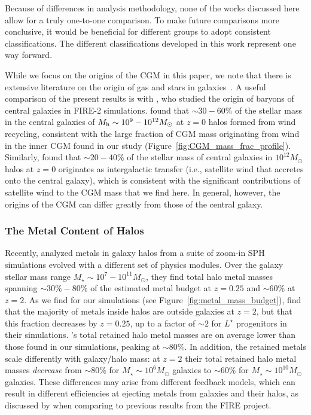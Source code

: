 \documentclass[fleqn,usenatbib]{mnras}
\begin{document}
Because of differences in analysis methodology, none of the works discussed here allow for a truly one-to-one comparison.
To make future comparisons more conclusive, it would be beneficial for different groups to adopt consistent classifications. 
The different classifications developed in this work represent one way forward.

While we focus on the origins of the CGM in this paper, we note that there is extensive literature on the origin of gas and stars in galaxies~\citep[e.g.][]{Oppenheimer2010,VandeVoort2011,Nelson2015,VandeVoort2016a}.
A useful comparison of the present results is with \cite{Angles-Alcazar2017}, who studied the origin of baryons of central galaxies in FIRE-2 simulations.
\citeauthor{Angles-Alcazar2017} found that $\sim 30-60\%$ of the stellar mass in the central galaxies of $M_{\rm h} \sim 10^{9} - 10^{12} M_\odot$ at $z=0$ halos formed from wind recycling, consistent with the large fraction of CGM mass originating from wind in the inner CGM found in our study (Figure~\ref{fig:CGM_mass_frac_profile}).
Similarly, \citeauthor{Angles-Alcazar2017} found that $\sim 20-40\%$ of the stellar mass of central galaxies in $10^{12} M_\odot$ halos at $z=0$ originates as intergalactic transfer (i.e., satellite wind that accretes onto the central galaxy), which is consistent with the significant contributions of satellite wind to the CGM mass that we find here. 
In general, however, the origins of the CGM can differ greatly from those of the central galaxy.

\subsubsection{The Metal Content of Halos}
\label{sec:discussion_metal_content}

Recently, \cite{Christensen2018} analyzed metals in galaxy halos from a suite of zoom-in SPH simulations evolved with a different set of physics modules. 
Over the galaxy stellar mass range $M_\star \sim 10^{7} - 10^{11} M_\odot$, they find total halo metal masses spanning $\sim 30\%-80\%$ of the estimated metal budget at $z=0.25$ and $\sim 60\%$ at $z=2$.
As we find for our simulations (see Figure~\ref{fig:metal_mass_budget}), \cite{Christensen2018} find that the majority of metals inside halos are outside galaxies at $z=2$, but that this fraction decreases by $z=0.25$, up to a factor of $\sim2$ for $L^{\star}$ progenitors in their simulations.
\cite{Christensen2018}'s total retained halo metal masses are on average lower than those found in our simulations, peaking at $\sim80\%$.
In addition, the retained metals scale differently with galaxy/halo mass: at $z=2$ their total retained halo metal masses \textit{decrease} from $\sim80\%$ for $M_\star \sim 10^6 M_\odot$ galaxies to $\sim 60\%$ for $M_\star \sim 10^{10} M_\odot$ galaxies.
These differences may arise from different feedback models, which can result in different efficiencies at ejecting metals from galaxies and their halos, as discussed by \citeauthor{Christensen2018} when comparing to previous results from the FIRE project.
\end{document}
